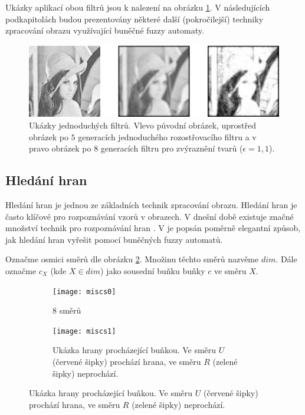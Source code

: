 \documentclass[a4paper,10pt]{article}
\begin{document}
Ukázky aplikací obou filtrů jsou k nalezení na obrázku \ref{img:Filters}. V následujících podkapitolách budou prezentovány některé další (pokročilejší) techniky zpracování obrazu využívající buněčné fuzzy automaty.

\begin{figure}[]
 \includegraphics[width=\textwidth]{filters}
 
 \caption{Ukázky jednoduchých filtrů. Vlevo původní obrázek, uprostřed obrázek po $5$ generacích jednoduchého rozostřovacího filtru a v pravo obrázek po $8$ generacích filtru pro zvýraznění tvarů ($\epsilon = 1,1$).} \label{img:Filters}
\end{figure}

\subsection{Hledání hran}
Hledání hran je jednou ze základních technik zpracování obrazu. Hledání hran je často klíčové pro rozpoznávání vzorů v obrazech. V dnešní době existuje značné množství technik pro rozpoznávání hran \cite{MaiAgg-StuComVarImDetEdTec}. V \cite{MarMeySol-HybMetGasDifModFuzCelAutImSha} je popsán poměrně elegantní způsob, jak hledání hran vyřešit pomocí buněčných fuzzy automatů.

Označme osmici směrů dle obrázku \ref{img:Directions:8Directions}. Množinu těchto směrů nazvěme $dim$. Dále označme $c_X$ (kde $X \in dim$) jako sousední buňku buňky $c$ ve směru $X$.

\begin{figure}
   \begin{subfigure}[t]{0.4\textwidth}
      \texttt{[image: miscs0]}
      \caption{8 směrů}  \label{img:Directions:8Directions}
    \end{subfigure}%
%
    \begin{subfigure}[t]{0.4\textwidth}
      \texttt{[image: miscs1]}
      \caption{Ukázka hrany procházející buňkou. Ve směru $U$ (červené šipky) prochází hrana, ve směru $R$ (zelené šipky) neprochází.}  \label{img:Directions:Edges}
    \end{subfigure}
\end{figure}
\end{document}
